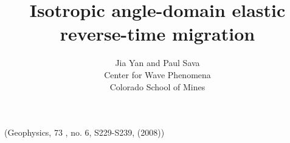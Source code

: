 \published(Geophysics, 73 , no. 6, S229-S239, (2008))
\title{Isotropic angle-domain elastic reverse-time migration}
\author{Jia Yan and Paul Sava \\ 
Center for Wave Phenomena \\ 
Colorado School of Mines}

\maketitle





\def\geouline#1{#1}
\def\geosout#1{}

     
 
  
 
     
        
     
   
  




